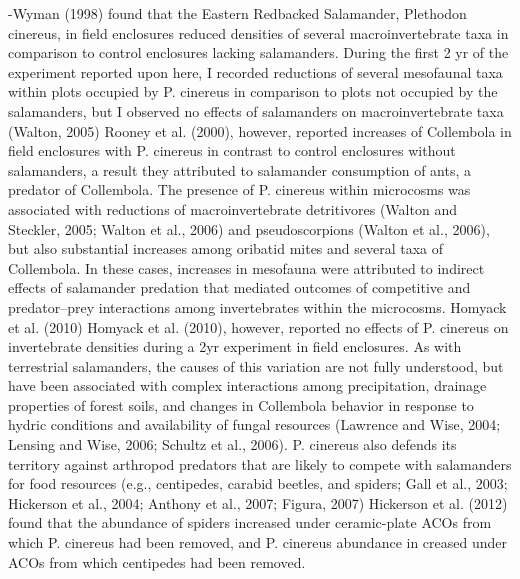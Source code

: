  -Wyman (1998) found that the Eastern Redbacked Salamander, Plethodon cinereus, in field enclosures reduced densities of several macroinvertebrate taxa in comparison to control enclosures lacking salamanders.
 During the first 2 yr of the experiment reported upon here, I recorded reductions of several mesofaunal taxa within plots occupied by P. cinereus in comparison to plots not occupied by the salamanders, but I observed no effects of salamanders on macroinvertebrate taxa (Walton, 2005)
 Rooney et al. (2000), however, reported increases of Collembola in field enclosures with P. cinereus in contrast to control enclosures without salamanders, a result they attributed to salamander consumption of ants, a predator of Collembola.
 The presence of P. cinereus within microcosms was associated with reductions of macroinvertebrate detritivores (Walton and Steckler, 2005; Walton et al., 2006) and pseudoscorpions (Walton et al., 2006), but also substantial increases among oribatid mites and several taxa of Collembola.
 In these cases, increases in mesofauna were attributed to indirect effects of salamander predation that mediated outcomes of competitive and predator–prey interactions among invertebrates within the microcosms. 
 Homyack et al. (2010) Homyack et al. (2010), however, reported no effects of P. cinereus on invertebrate densities during a 2yr experiment in field enclosures.
 As with terrestrial salamanders, the causes of this variation are not fully understood, but have been associated with complex interactions among precipitation, drainage properties of forest soils, and changes in Collembola behavior in response to hydric conditions and availability of fungal resources (Lawrence and Wise, 2004; Lensing and Wise, 2006; Schultz et al., 2006).
 P. cinereus also defends its territory against arthropod predators that are likely to compete with salamanders for food resources (e.g., centipedes, carabid beetles, and spiders; Gall et al., 2003; Hickerson et al., 2004; Anthony et al., 2007; Figura, 2007)
 Hickerson et al. (2012) found that the abundance of spiders increased under ceramic-plate ACOs from which P. cinereus had been removed, and P. cinereus abundance in creased under ACOs from which centipedes had been removed.

 


